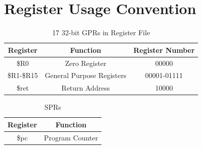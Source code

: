 \documentclass{article}
\begin{document}
\section{Register Usage Convention}

\begin{table}[H]
    \centering
    \begin{tabular}{|c|c|c|}
        \hline
        \textbf{Register} & \textbf{Function} & \textbf{Register Number} \\
        \hline
        \$R0 & Zero Register & 00000 \\
        \$R1-\$R15 & General Purpose Registers & 00001-01111 \\
        \$ret & Return Address & 10000 \\
        \hline
    \end{tabular}
    \caption{17 32-bit GPRs in Register File}
\end{table}

\begin{table}[H]
    \centering
    \begin{tabular}{|c|c|}
        \hline
        \textbf{Register} & \textbf{Function} \\
        \hline
        \$pc & Program Counter \\
        \hline
    \end{tabular}
    \caption{SPRs}
\end{table}
\end{document}
